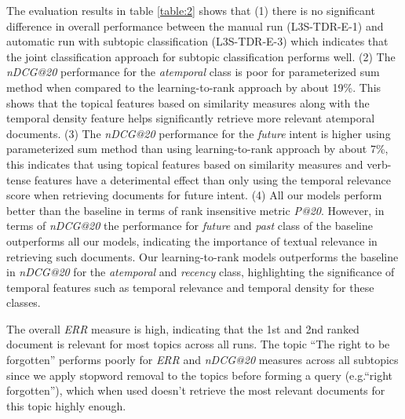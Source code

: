 \documentclass{sig-alternate}
\begin{document}
The evaluation results in table \ref{table:2} shows that (1) there is no significant difference in overall performance between the manual run (\textsf{L3S-TDR-E-1}) and automatic run with subtopic classification (\textsf{L3S-TDR-E-3}) which indicates that the joint classification approach for subtopic classification performs well. (2) The \textit{nDCG@20} performance for the \textit{atemporal} class is poor for parameterized sum method when compared to the learning-to-rank approach by about 19\%. This shows that the topical features based on similarity measures along with the temporal density feature helps significantly retrieve more relevant atemporal documents. (3) The \textit{nDCG@20} performance for the \textit{future} intent is higher using parameterized sum method than using learning-to-rank approach by about 7\%, this indicates that using topical features based on similarity measures and verb-tense features have a deterimental effect than only using the temporal relevance score when retrieving documents for future intent. (4) All our models perform better than the baseline in terms of rank insensitive metric \textit{P@20}. However, in terms of \textit{nDCG@20} the performance for \textit{future} and \textit{past} class of the baseline outperforms all our models, indicating the importance of textual relevance in retrieving such documents. Our learning-to-rank models outperforms the baseline in \textit{nDCG@20} for the \textit{atemporal} and \textit{recency} class, highlighting the significance of temporal features such as temporal relevance and temporal density for these classes. 

The overall \textit{ERR} measure is high, indicating that the 1st and 2nd ranked document is relevant for most topics across all runs. The topic ``The right to be forgotten'' performs poorly for \textit{ERR} and \textit{nDCG@20} measures across all subtopics since we apply stopword removal to the topics before forming a query (e.g.``right forgotten''), which when used doesn't retrieve the most relevant documents for this topic highly enough.
\end{document}
